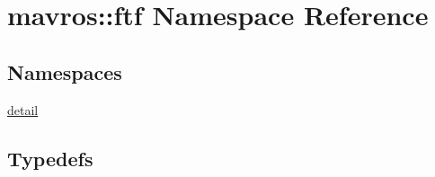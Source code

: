 \hypertarget{namespacemavros_1_1ftf}{}\section{mavros\+::ftf Namespace Reference}
\label{namespacemavros_1_1ftf}
\subsection*{Namespaces}
\begin{DoxyCompactItemize}
\item 
 \mbox{\hyperlink{namespacemavros_1_1ftf_1_1detail}{detail}}
\end{DoxyCompactItemize}
\subsection*{Typedefs}
